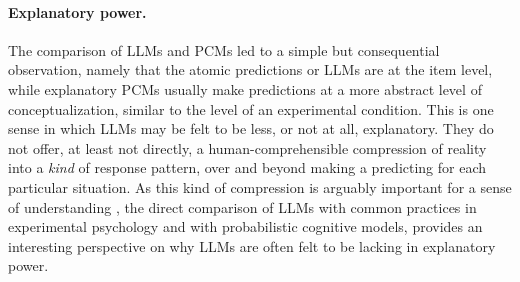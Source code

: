 \documentclass[fleqn]{article}
\begin{document}
\paragraph{Explanatory power.}
The comparison of LLMs and PCMs led to a simple but consequential observation, namely that the atomic predictions or LLMs are at the item level, while explanatory PCMs usually make predictions at a more abstract level of conceptualization, similar to the level of an experimental condition.
This is one sense in which LLMs may be felt to be less, or not at all, explanatory.
They do not offer, at least not directly, a human-comprehensible compression of reality into a \emph{kind} of response pattern, over and beyond making a predicting for each particular situation.
As this kind of compression is arguably important for a sense of understanding \citep{Dellsen2020:Beyond-Explanat,Grimm2021:Understanding}, the direct comparison of LLMs with common practices in experimental psychology and with probabilistic cognitive models, provides an interesting perspective on why LLMs are often felt to be lacking in explanatory power.
\end{document}
